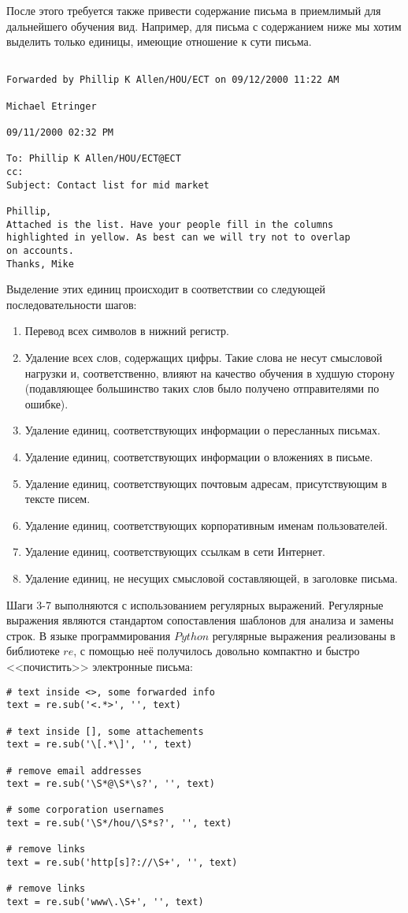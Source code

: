 После этого требуется также привести содержание письма в приемлимый для дальнейшего обучения вид. Например, для письма с содержанием ниже мы хотим выделить только единицы, имеющие отношение к сути письма.

\begin{verbatim}

Forwarded by Phillip K Allen/HOU/ECT on 09/12/2000 11:22 AM 

Michael Etringer

09/11/2000 02:32 PM

To: Phillip K Allen/HOU/ECT@ECT
cc:  
Subject: Contact list for mid market

Phillip,
Attached is the list. Have your people fill in the columns 
highlighted in yellow. As best can we will try not to overlap
on accounts. 
Thanks, Mike
\end{verbatim}

Выделение этих единиц происходит в соответствии со следующей последовательности шагов:
\begin{enumerate}
\item Перевод всех символов в нижний регистр.
\item Удаление всех слов, содержащих цифры. Такие слова не несут смысловой нагрузки и, соответственно, влияют на качество обучения в худшую сторону (подавляющее большинство таких слов было получено отправителями по ошибке).
\item Удаление единиц, соответствующих информации о пересланных письмах.
\item Удаление единиц, соответствующих информации о вложениях в письме.
\item Удаление единиц, соответствующих почтовым адресам, присутствующим в тексте писем.
\item Удаление единиц, соответствующих корпоративным именам пользователей.
\item Удаление единиц, соответствующих ссылкам в сети Интернет.
\item Удаление единиц, не несущих смысловой составляющей, в заголовке письма.
\end{enumerate}

Шаги 3-7 выполняются с использованием регулярных выражений. Регулярные выражения являются стандартом сопоставления шаблонов для анализа и замены строк. В языке программирования 
$Python$ регулярные выражения реализованы в библиотеке $re$, с помощью неё получилось
довольно компактно и быстро <<почистить>> электронные письма:

\begin{verbatim}
# text inside <>, some forwarded info
text = re.sub('<.*>', '', text)

# text inside [], some attachements
text = re.sub('\[.*\]', '', text) 

# remove email addresses
text = re.sub('\S*@\S*\s?', '', text) 

# some corporation usernames
text = re.sub('\S*/hou/\S*s?', '', text)

# remove links
text = re.sub('http[s]?://\S+', '', text) 

# remove links
text = re.sub('www\.\S+', '', text) 
\end{verbatim}


